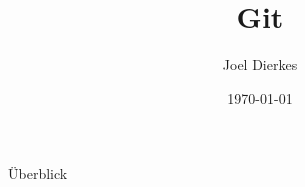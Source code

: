 \documentclass{beamer}
\title{Git}
\author{Joel Dierkes}
\date{\today}
\begin{document}
\maketitle
\begin{frame}{Überblick}
\tableofcontents
\end{frame}


\end{document}
